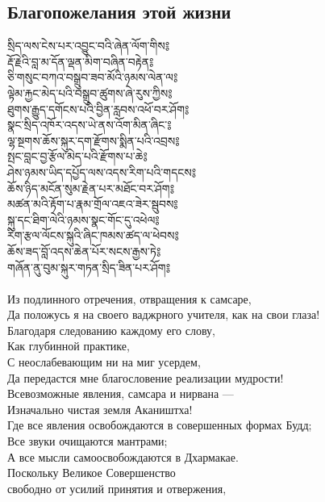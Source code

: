 \subsection{Благопожелания этой жизни}
\vspace{0.5cm}
\ti
སྲིད་ལས་ངེས་པར་འབྱུང་བའི་ཞེན་ལོག་གིས༔\\
རྡོ་རྗེའི་བླ་མ་དོན་ལྡན་མིག་བཞིན་བརྟེན༔\\
ཅི་གསུང་བཀའ་བསྒྲུབ་ཟབ་མོའི་ཉམས་ལེན་ལ༔\\
ལྟེམ་རྐྱང་མེད་པའི་བསྒྲུབ་ཚུགས་ཞེ་རུས་ཀྱིས༔\\
ཐུགས་རྒྱུད་དགོངས་པའི་བྱིན་རླབས་འཕོ་བར་ཤོག༔\\
སྣང་སྲིད་འཁོར་འདས་ཡེ་ནས་འོག་མིན་ཞིང་༔\\
ལྷ་སྔགས་ཆོས་སྐུར་དག་རྫོགས་སྨིན་པའི་འབྲས༔\\
སྤང་བླང་བྱ་རྩོལ་མེད་པའི་རྫོགས་པ་ཆེ༔\\
ཤེས་ཉམས་ཡིད་དཔྱོད་ལས་འདས་རིག་པའི་གདངས༔\\
ཆོས་ཉིད་མངོན་སུམ་རྗེན་པར་མཐོང་བར་ཤོག༔\\
མཚན་མའི་རྟོག་པ་རྣམ་གྲོལ་འཇའ་ཟེར་སྦུབས༔\\
སྐུ་དང་ཐིག་ལེའི་ཉམས་སྣང་གོང་དུ་འཕེལ༔\\
རིག་རྩལ་ལོངས་སྐུའི་ཞིང་ཁམས་ཚད་ལ་ཕེབས༔\\
ཆོས་ཟད་བློ་འདས་ཆེན་པོར་སངས་རྒྱས་ཏེ༔\\
གཞོན་ནུ་བུམ་སྐུར་གཏན་སྲིད་ཟིན་པར་ཤོག༔\\
\\
\ru
Из подлинного отречения, отвращения к самсаре,\\
Да положусь я на своего ваджрного учителя, как на свои глаза!\\
Благодаря следованию каждому его слову,\\
Как глубинной практике,\\
С неослабевающим ни на миг усердем,\\
Да передастся мне благословение реализации мудрости!\\
\newpage
Всевозможные явления, самсара и нирвана —\\
Изначально чистая земля Акаништха!\\
Где все явления освобождаются в совершенных формах Будд;\\
Все звуки очищаются мантрами;\\
А все мысли самоосвобождаются в Дхармакае.\\
Поскольку Великое Совершенство \\ \indent свободно от усилий принятия и отвержения,\\
